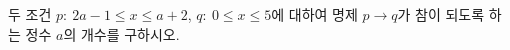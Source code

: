 두 조건 $p:\ 2a-1\le x\le a+2$, $q:\ 0\le x\le 5$에 대하여 명제 $p\longrightarrow q$가 참이 되도록 하는 정수 $a$의 개수를 구하시오.
